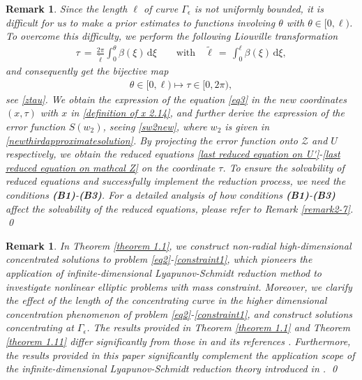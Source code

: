 \documentclass[10pt, reqno]{amsart}
\numberwithin{equation}{section}
\theoremstyle{definition}
\newtheorem{remark}[theorem]{Remark}
\def\G{{\mathfrak G}}
\def\G{\Gamma}
\begin{document}
{\medskip
\begin{remark}\label{remark2-8}
{\it
Since the length $\ell$ of curve $\G_\epsilon$ is not uniformly bounded, it is difficult for us to make a prior estimates to functions involving $\theta$ with $\theta\in[0, \ell)$. To overcome this difficulty, we perform the following Liouville transformation
\begin{align*}
 \tau \,=\, \frac{2\pi}{\tilde\ell} \int_0^{\theta} \beta (\xi) \,{\mathrm d} \xi
\qquad\mbox{with}\quad
 {\tilde\ell} \,=\, \int_0^{\ell} \beta (\xi) \,{\mathrm d} \xi,
\end{align*}
and consequently get the bijective map
\begin{align*}
\theta \in [0, \ell)\mapsto \tau \in [0, 2\pi),
\end{align*}
see \eqref{ztau}.
We obtain the expression of the equation \eqref{eq3} in the new coordinates $(x, \tau)$ with $x$ in \eqref{definition of x 2.14}, and further derive the expression of the error function $S(w_2)$, seeing \eqref{sw2new}, where $w_2$ is given in \eqref{newthirdapproximatesolution}.
By projecting the error function onto $\mathcal Z$ and $U$ respectively, we obtain the reduced equations \eqref{last reduced equation on U'}-\eqref{last reduced equation on mathcal Z} on the coordinate $\tau$. To ensure the solvability of reduced equations and successfully implement the reduction process, we need the conditions {\bf{(B1)}}-{\bf{(B3)}}.
 For a detailed analysis of how conditions {\bf{(B1)}}-{\bf{(B3)}} affect the solvability of the reduced equations, please refer to Remark \ref{remark2-7}.
\qed
}
\end{remark}







\begin{remark}\label{remark2-9}
{\it
 In Theorem \ref{theorem 1.1}, we construct non-radial high-dimensional concentrated solutions to problem \eqref{eq2}-\eqref{constraint1}, which pioneers the application of infinite-dimensional Lyapunov-Schmidt reduction method to investigate nonlinear elliptic problems with mass constraint.
 Moreover, we clarify the effect of the length of the concentrating curve in the higher dimensional concentration phenomenon of problem \eqref{eq2}-\eqref{constraint1}, and construct solutions concentrating at $\G_\epsilon$. The results provided in Theorem \ref{theorem 1.1} and Theorem \ref{theorem 1.11} differ significantly from those in \cite{delPKowWei1} and its references \cite{machiodi, WangWeiYang, Wangzhao, WeiYang, Wei-xu-yang, SWei-Yang}. Furthermore, the results provided in this paper significantly complement the application scope of the infinite-dimensional Lyapunov-Schmidt reduction theory introduced in \cite{delPKowWei1}.
\qed
}
\end{remark}








}
\end{document}
